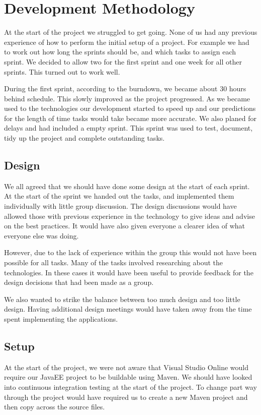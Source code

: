 \section{Development Methodology}

At the start of the project we struggled to get going. None of us had any previous experience of how to perform the initial setup of a project. For example we had to work out how long the sprints should be, and which tasks to assign each sprint. We decided to allow two for the first sprint and one week for all other sprints. This turned out to work well. 

During the first sprint, according to the burndown, we became about 30 hours behind schedule. This slowly improved as the project progressed. As we became used to the technologies our development started to speed up and our predictions for the length of time tasks would take became more accurate. We also planed for delays and had included a empty sprint. This sprint was used to test, document, tidy up the project and complete outstanding tasks.

\subsection{Design}
We all agreed that we should have done some design at the start of each sprint. At the start of the sprint we handed out the tasks, and implemented them individually with little group discussion. The design discussions would have allowed those with previous experience in the technology to give ideas and advise on the best practices. It would have also given everyone a clearer idea of what everyone else was doing.

However, due to the lack of experience within the group this would not have been possible for all tasks. Many of the tasks involved researching about the technologies. In these cases it would have been useful to provide feedback for the design decisions that had been made as a group.

We also wanted to strike the balance between too much design and too little design. Having additional design meetings would have taken away from the time spent implementing the applications. 

\subsection{Setup}

At the start of the project, we were not aware that Visual Studio Online would require our JavaEE project to be buildable using Maven. We should have looked into continuous integration testing at the start of the project. To change part way through the project would have required us to create a new Maven project and then copy across the source files.

